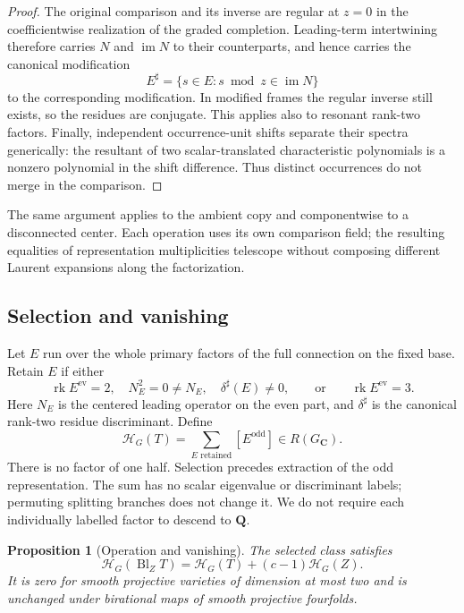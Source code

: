 \documentclass[11pt]{article}
\newtheorem{proposition}[theorem]{Proposition}
\newcommand{\Q}{\mathbf Q}
\newcommand{\C}{\mathbf C}
\newcommand{\ev}{\mathrm{ev}}
\newcommand{\odd}{\mathrm{odd}}
\newcommand{\rk}{\operatorname{rk}}
\newcommand{\im}{\operatorname{im}}
\newcommand{\Bl}{\operatorname{Bl}}
\begin{document}
\begin{proof}
The original comparison and its inverse are regular at $z=0$ in the
coefficientwise realization of the graded completion. Leading-term
intertwining therefore carries $N$ and $\im N$ to their counterparts,
and hence carries the canonical modification
\[
 E^\sharp=\{s\in E:s\bmod z\in\im N\}
\]
to the corresponding modification. In modified frames the regular inverse
still exists, so the residues are conjugate. This applies also to resonant
rank-two factors. Finally, independent occurrence-unit shifts separate
their spectra generically: the resultant of two scalar-translated
characteristic polynomials is a nonzero polynomial in the shift difference.
Thus distinct occurrences do not merge in the comparison.
\end{proof}

The same argument applies to the ambient copy and componentwise to a
disconnected center. Each operation uses its own comparison field; the
resulting equalities of representation multiplicities telescope without
composing different Laurent expansions along the factorization.

\subsection{Selection and vanishing}

Let $E$ run over the whole primary factors of the full connection on the
fixed base. Retain $E$ if either
\[
 \rk E^\ev=2,\quad N_E^2=0\ne N_E,\quad\delta^\sharp(E)\ne0,
 \qquad\text{or}\qquad \rk E^\ev=3.
\]
Here $N_E$ is the centered leading operator on the even part, and
$\delta^\sharp$ is the canonical rank-two residue discriminant. Define
\[
 \mathcal H_G(T)=\sum_{E\text{ retained}}[E^\odd]\in R(G_\C).
\]
There is no factor of one half. Selection precedes extraction of the odd
representation. The sum has no scalar eigenvalue or discriminant labels;
permuting splitting branches does not change it. We do not require each
individually labelled factor to descend to $\Q$.

\begin{proposition}[Operation and vanishing]
\label{prop:prototype-operations}
The selected class satisfies
\[
 \mathcal H_G(\Bl_ZT)=\mathcal H_G(T)+(c-1)\mathcal H_G(Z).
\]
It is zero for smooth projective varieties of dimension at most two and
is unchanged under birational maps of smooth projective fourfolds.
\end{proposition}
\end{document}
